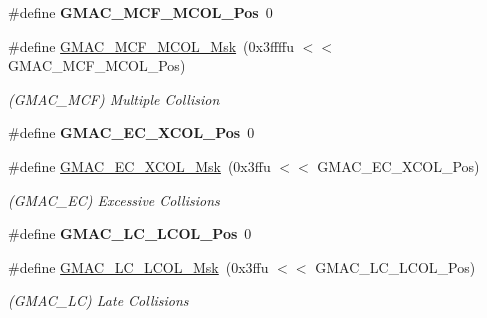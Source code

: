 \begin{DoxyCompactItemize}
\mbox{\label{group__SAME70__GMAC_ga9b33251f1657f6b8e02c06149702ef15}} 
\#define {\bfseries G\+M\+A\+C\+\_\+\+M\+C\+F\+\_\+\+M\+C\+O\+L\+\_\+\+Pos}~0
\item 
\mbox{\label{group__SAME70__GMAC_gab4968cffa915c05f0870488d0f65e102}} 
\#define \mbox{\hyperlink{group__SAME70__GMAC_gab4968cffa915c05f0870488d0f65e102}{G\+M\+A\+C\+\_\+\+M\+C\+F\+\_\+\+M\+C\+O\+L\+\_\+\+Msk}}~(0x3ffffu $<$$<$ G\+M\+A\+C\+\_\+\+M\+C\+F\+\_\+\+M\+C\+O\+L\+\_\+\+Pos)
\begin{DoxyCompactList}\small\item\em (G\+M\+A\+C\+\_\+\+M\+CF) Multiple Collision \end{DoxyCompactList}\item 
\mbox{\label{group__SAME70__GMAC_gadc592bc3f74e244301db9ee6d7102aa9}} 
\#define {\bfseries G\+M\+A\+C\+\_\+\+E\+C\+\_\+\+X\+C\+O\+L\+\_\+\+Pos}~0
\item 
\mbox{\label{group__SAME70__GMAC_ga8e8ad955206e7bd23da505bc6a287c59}} 
\#define \mbox{\hyperlink{group__SAME70__GMAC_ga8e8ad955206e7bd23da505bc6a287c59}{G\+M\+A\+C\+\_\+\+E\+C\+\_\+\+X\+C\+O\+L\+\_\+\+Msk}}~(0x3ffu $<$$<$ G\+M\+A\+C\+\_\+\+E\+C\+\_\+\+X\+C\+O\+L\+\_\+\+Pos)
\begin{DoxyCompactList}\small\item\em (G\+M\+A\+C\+\_\+\+EC) Excessive Collisions \end{DoxyCompactList}\item 
\mbox{\label{group__SAME70__GMAC_ga154bd103c0a73cd63857efc227214a30}} 
\#define {\bfseries G\+M\+A\+C\+\_\+\+L\+C\+\_\+\+L\+C\+O\+L\+\_\+\+Pos}~0
\item 
\mbox{\label{group__SAME70__GMAC_gacd545e55a56be6ea38f4f4c141cfe37f}} 
\#define \mbox{\hyperlink{group__SAME70__GMAC_gacd545e55a56be6ea38f4f4c141cfe37f}{G\+M\+A\+C\+\_\+\+L\+C\+\_\+\+L\+C\+O\+L\+\_\+\+Msk}}~(0x3ffu $<$$<$ G\+M\+A\+C\+\_\+\+L\+C\+\_\+\+L\+C\+O\+L\+\_\+\+Pos)
\begin{DoxyCompactList}\small\item\em (G\+M\+A\+C\+\_\+\+LC) Late Collisions \end{DoxyCompactList}\item 
$$
\end{DoxyCompactItemize}
